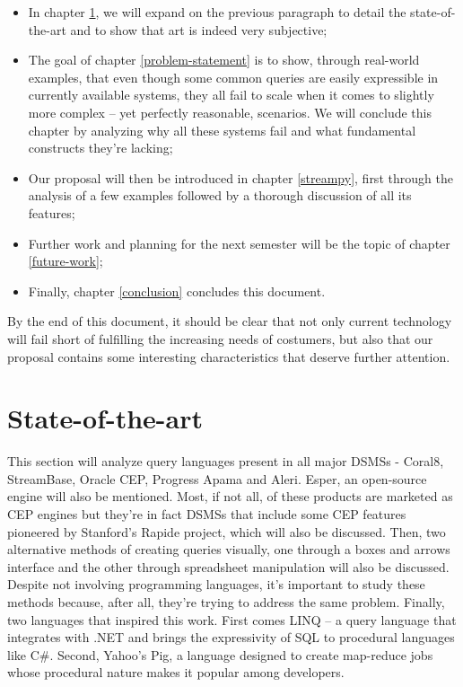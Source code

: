 \documentclass{report}
\begin{document}
\begin{itemize}
\item In chapter \ref{state-of-the-art}, we will expand on the previous paragraph to detail the state-of-the-art and to show that art is indeed very subjective;
\item The goal of chapter \ref{problem-statement} is to show, through real-world examples, that even though some common queries are easily expressible in currently available systems, they all fail to scale when it comes to slightly more complex -- yet perfectly reasonable, scenarios. We will conclude this chapter by analyzing why all these systems fail and what fundamental constructs they're lacking;
\item Our proposal will then be introduced in chapter \ref{streampy}, first through the analysis of a few examples followed by a thorough discussion of all its features;
\item Further work and planning for the next semester will be the topic of chapter \ref{future-work};
\item Finally, chapter \ref{conclusion} concludes this document.
\end{itemize}

By the end of this document, it should be clear that not only current technology will fail short of fulfilling the increasing needs of costumers, but also that our proposal contains some interesting characteristics that deserve further attention.

\chapter{State-of-the-art}\label{state-of-the-art}

This section will analyze query languages present in all major DSMSs - Coral8, StreamBase, Oracle CEP, Progress Apama and Aleri. Esper, an open-source engine will also be mentioned. Most, if not all, of these products are marketed as CEP engines but they're in fact DSMSs that include some CEP features pioneered by Stanford's Rapide project, which will also be discussed. Then, two alternative methods of creating queries visually, one through a boxes and arrows interface and the other through spreadsheet manipulation will also be discussed. Despite not involving programming languages, it's important to study these methods because, after all, they're trying to address the same problem. Finally, two languages that inspired this work. First comes LINQ -- a query language that integrates with .NET and brings the expressivity of SQL to procedural languages like C\#. Second, Yahoo's Pig, a language designed to create map-reduce jobs whose procedural nature makes it popular among developers.
\end{document}
